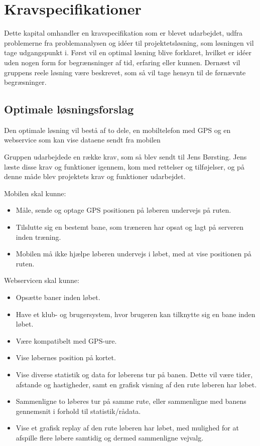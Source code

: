 \chapter{Kravspecifikationer}
 Dette kapital omhandler en kravspecifikation som er blevet udarbejdet, udfra problemerne fra problemanalysen og idéer til projektetsløsning, som løsningen vil tage udgangspunkt i. Først vil en optimal løsning blive forklaret, hvilket er idéer uden nogen form for begrænsninger af tid, erfaring eller kunnen. Dernæst vil gruppens reele løsning være beskrevet, som så vil tage hensyn til de førnævnte begræsninger.

\section{Optimale løsningsforslag}
Den optimale løsning vil bestå af to dele, en mobiltelefon med GPS og en webservice som kan vise dataene sendt fra mobilen

Gruppen udarbejdede en række krav, som så blev sendt til Jens Børsting. Jens læste disse krav og funktioner igennem, kom med rettelser og tilføjelser, og på denne måde blev projektets krav og funktioner udarbejdet. 

Mobilen skal kunne:
\begin{itemize}
	\item Måle, sende og optage GPS positionen på løberen undervejs på ruten.
	\item Tilslutte sig en bestemt bane, som træneren har opsat og lagt på serveren inden træning.
	\item Mobilen må ikke hjælpe løberen undervejs i løbet, med at vise positionen på ruten.
\end{itemize}

Webservicen skal kunne:
\begin{itemize}
	\item Opsætte baner inden løbet.
	\item Have et klub- og brugersystem, hvor brugeren kan tilknytte sig en bane inden løbet.
	\item Være kompatibelt med GPS-ure.
	\item Vise løbernes position på kortet.
	\item Vise diverse statistik og data for løberens tur på banen. Dette vil være tider, afstande og hastigheder, samt en grafisk visning af den rute løberen har løbet.
	\item Sammenligne to løberes tur på samme rute, eller sammenligne med banens gennemsnit i forhold til statistik/rådata.
	\item Vise et grafisk replay af den rute løberen har løbet, med mulighed for at afspille flere løbere samtidig og dermed sammenligne vejvalg.
\end{itemize} 

